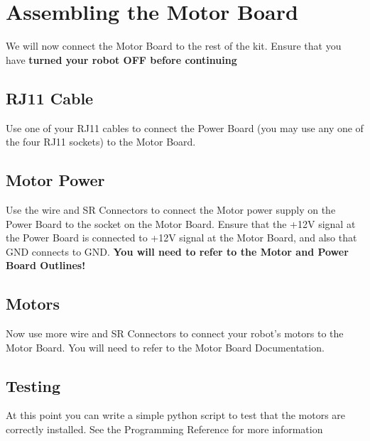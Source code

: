 \section{Assembling the Motor Board}
We will now connect the Motor Board to the rest of the kit. Ensure that you have {\bf turned your robot OFF before continuing}

\subsection{RJ11 Cable}
Use one of your RJ11 cables to connect the Power Board (you may use any one of the four RJ11 sockets) to the Motor Board.

\subsection{Motor Power}
Use the wire and SR Connectors to connect the Motor power supply on the Power Board to the socket on the Motor Board. Ensure that the +12V signal at the Power Board is connected to +12V signal at the Motor Board, and also that GND connects to GND. {\bf You will need to refer to the Motor and Power Board Outlines!}

\subsection{Motors}
Now use more wire and SR Connectors to connect your robot's motors to the Motor Board. You will need to refer to the Motor Board Documentation.

\subsection{Testing}
At this point you can write a simple python script to test that the motors are correctly installed. See the Programming Reference for more information


 

